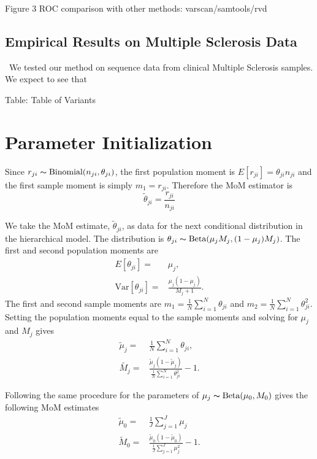 \documentclass[11pt,reqno]{amsart}
\begin{document}
Figure 3 ROC comparison with other methods: varscan/samtools/rvd


\subsection{Empirical Results on Multiple Sclerosis Data}\
We tested our method on sequence data from clinical Multiple Sclerosis samples. We expect to see that 

Table: Table of Variants



\appendix
\section{Parameter Initialization}\label{sec:appendix_mom}
Since $r_{ji} \thicksim \text{Binomial}(n_{ji}, \theta_{ji})$, the first population moment is  $E[r_{ji}] = \theta_{ji} n_{ji}$ and the first sample moment is simply $m_1 = r_{ji}$. Therefore the MoM estimator is 
\begin{equation}
	\tilde{\theta}_{ji} = \frac{r_{ji}} {n_{ji}}
\end{equation}

We take the MoM estimate, $\tilde{\theta}_{ji}$, as data for the next conditional distribution in the hierarchical model. The distribution is $\theta_{ji} \thicksim \text{Beta}(\mu_jM_j, (1-\mu_j)M_j)$. The first and second population moments are
\begin{eqnarray}
	E[\theta_{ji}] =& \mu_j,\\
	\text{Var}[\theta_{ji}] =& \frac{\mu_j(1-\mu_j)} { M_j + 1 }.
\end{eqnarray}
The first and second sample moments are $m_1 = \frac{1}{N}\sum_{i=1}^N \theta_{ji}$ and $m_2 = \frac{1}{N}\sum_{i=1}^N \theta_{ji}^2$. Setting the population moments equal to the sample moments and solving for $\mu_j$ and $M_j$ gives
\begin{eqnarray}
	\tilde{\mu}_j =& \frac{1}{N} \sum_{i=1}^N \theta_{ji}, \\
	\tilde{M_j} =& \frac{ \tilde{\mu}_j (1 - \tilde{\mu}_j ) } { \frac{1}{N} \sum_{i=1}^N \theta_{ji}^2 } -1.
\end{eqnarray}

Following the same procedure for the parameters of $\mu_j \thicksim \text{Beta}(\mu_0, M_0)$ gives the following MoM estimates
\begin{eqnarray}
	\tilde{\mu}_0 =& \frac{1}{J} \sum_{j=1}^J \mu_j \\
	\tilde{M}_0 =& \frac{ \tilde{\mu}_0 (1 - \tilde{\mu}_0 ) } {\frac{1}{J} \sum_{j=1}^J \mu_j^2 } -1.
\end{eqnarray}



\end{document}
